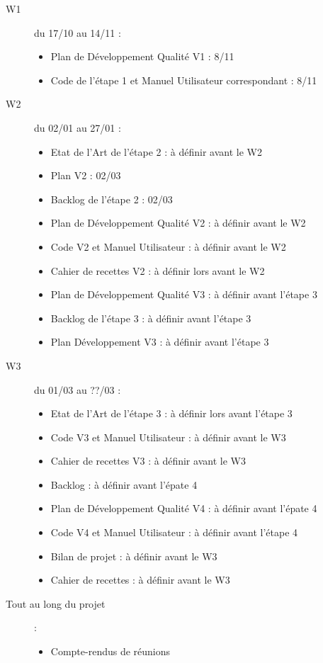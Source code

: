 \documentclass[10pt,a4paper]{article}
\begin{document}
\begin{description}

\item [W1] du 17/10 au 14/11 : 
\begin{itemize}
\item Plan de Développement Qualité V1 : 8/11
\item Code de l'étape 1 et Manuel Utilisateur correspondant : 8/11
\end{itemize}

\item [W2] du 02/01 au 27/01  : 
\begin{itemize}
\item Etat de l'Art de l'étape 2 : à définir avant le W2
\item Plan  V2 : 02/03
\item Backlog de l'étape 2 : 02/03
\item Plan de Développement Qualité V2 : à définir avant le W2
\item Code V2 et Manuel Utilisateur : à définir avant le W2
\item Cahier de recettes V2 : à définir lors avant le W2
\item Plan de Développement Qualité V3 : à définir avant l'étape 3
\item Backlog de l'étape 3 : à définir avant l'étape 3
\item Plan Développement V3 : à définir avant l'étape 3
\end{itemize}

\item [W3] du 01/03 au ??/03  : 
\begin{itemize}
\item Etat de l'Art de l'étape 3  : à définir lors avant l'étape 3
\item Code V3 et Manuel Utilisateur : à définir avant le W3
\item Cahier de recettes V3 : à définir avant le W3
\item Backlog : à définir avant l'épate 4
\item Plan de Développement Qualité V4 : à définir avant l'épate 4
\item Code V4 et Manuel Utilisateur : à définir avant l'étape 4
\item Bilan de projet : à définir avant le W3
\item Cahier de recettes : à définir avant le W3
\end{itemize}

\item [Tout au long du projet] : 
\begin{itemize}
\item Compte-rendus de réunions 
\end{itemize}
\end{description}
\end{document}
